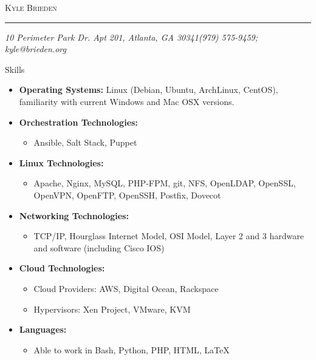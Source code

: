 \documentclass[10pt,oneside]{article}
\makeatletter
\newcommand{\name}{Kyle Brieden}
\newcommand{\addr}{10 Perimeter Park Dr. Apt 201, Atlanta, GA 30341}
\newcommand{\phone}{(979) 575-9459}
\newcommand{\email}{kyle@brieden.org}
\newcommand{\bigname}[1]{
    \begin{center}\fontfamily{phv}\selectfont\Huge\scshape#1\end{center}
}
\newenvironment{ressection}[1]{
    \vspace{4pt}
    {\fontfamily{phv}\selectfont\Large#1}
    \begin{itemize}
    \vspace{3pt}
}{
    \end{itemize}
}
\newcommand{\resitem}[1]{
    \vspace{-4pt}
    \item \begin{flushleft} #1 \end{flushleft}
}
\newcommand{\ressubitem}[1]{
    \vspace{-1pt}
    \item \begin{flushleft} #1 \end{flushleft}
}
\newcommand{\resbigitem}[3]{
    \vspace{-5pt}
    \item
    \textbf{#3} \\
    \textit{#1}---#2
}
\newenvironment{ressubsec}[3]{
    \resbigitem{#1}{#2}{#3}
    \vspace{-2pt}
    \begin{itemize}
}{
    \end{itemize}
}
\newenvironment{reslist}[1]{
    \resitem{\textbf{#1}}
    \vspace{-5pt}
    \begin{itemize}
}{
    \end{itemize}
}
\makeatother
\begin{document}
 \selectfont

\bigname{\name}

\vspace{-8pt} \rule{\textwidth}{1pt}

\vspace{-1pt} {\small\itshape \addr \hfill \phone; \email}

\vspace{8 pt}




%
%
%
%
\begin{ressection}{Skills}

    \resitem{\textbf{Operating Systems:} Linux (Debian, Ubuntu, ArchLinux, CentOS), familiarity with current Windows and Mac OSX versions.}

    \begin{reslist}{Orchestration Technologies:}
        \ressubitem{Ansible, Salt Stack, Puppet}
    \end{reslist}

    \begin{reslist}{Linux Technologies:}
        \ressubitem{Apache, Nginx, MySQL, PHP-FPM, git, NFS, OpenLDAP, OpenSSL, OpenVPN, OpenFTP, OpenSSH, Postfix, Dovecot}
    \end{reslist}

    \begin{reslist}{Networking Technologies:}
        \ressubitem{TCP/IP, Hourglass Internet Model, OSI Model, Layer 2 and 3 hardware and software (including Cisco IOS)}
    \end{reslist}

    \begin{reslist}{Cloud Technologies:}
		\ressubitem{Cloud Providers:  AWS, Digital Ocean, Rackspace}
        \ressubitem{Hypervisors:  Xen Project, VMware, KVM}
    \end{reslist}

    \begin{reslist}{Languages:}

        \ressubitem{Able to work in Bash, Python, PHP, HTML, \LaTeX\ }

    \end{reslist}

\end{ressection}
\end{document}
